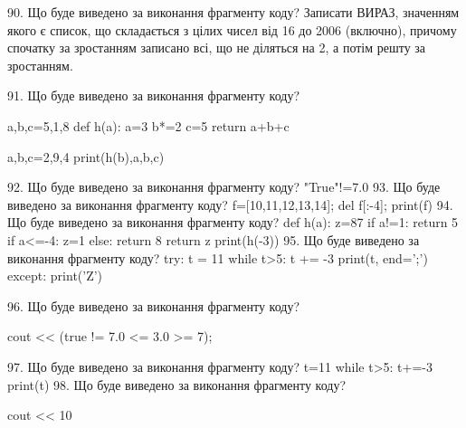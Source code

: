 \documentclass[11pt]{article}
\begin{document}
90. Що буде виведено за виконання фрагменту коду?
Записати ВИРАЗ, значенням якого є список, що складається з цілих чисел від 16 до 2006 (включно), причому спочатку за зростанням записано всі, що не діляться на 2, а потім решту за зростанням.

91. Що буде виведено за виконання фрагменту коду?

a,b,c=5,1,8
def h(a):
    a=3
    b*=2
    c=5
    return a+b+c

a,b,c=2,9,4
print(h(b),a,b,c)

92. Що буде виведено за виконання фрагменту коду?
"True"!=7.0
93. Що буде виведено за виконання фрагменту коду?
f=[10,11,12,13,14]; del f[:-4]; print(f)
94. Що буде виведено за виконання фрагменту коду?
def h(a):
      z=87
      if a!=1: return 5
      if a<=-4: z=1
      else: return 8
      return z
   print(h(-3))
95. Що буде виведено за виконання фрагменту коду?
try:
    t = 11
    while t>5:
        t += -3
    print(t, end=';')
except:
    print('Z')

96. Що буде виведено за виконання фрагменту коду?

cout << (true != 7.0 <= 3.0 >= 7);

97. Що буде виведено за виконання фрагменту коду?
t=11
   while t>5: t+=-3
   print(t)
98. Що буде виведено за виконання фрагменту коду?

cout << 10 %
\end{document}
